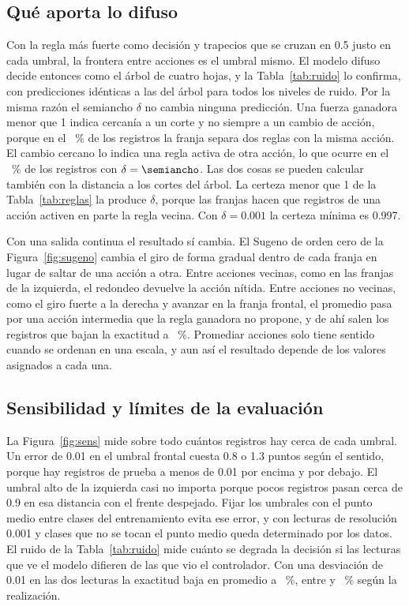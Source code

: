 \documentclass[11pt,letterpaper]{article}
\begin{document}
\subsection{Qué aporta lo difuso}

Con la regla más fuerte como decisión y trapecios que se cruzan en 0.5 justo en cada umbral, la frontera entre acciones es el umbral mismo. El modelo difuso decide entonces como el árbol de cuatro hojas, y la Tabla~\ref{tab:ruido} lo confirma, con predicciones idénticas a las del árbol para todos los niveles de ruido. Por la misma razón el semiancho $\delta$ no cambia ninguna predicción. Una fuerza ganadora menor que 1 indica cercanía a un corte y no siempre a un cambio de acción, porque en el \misma~\% de los registros la franja separa dos reglas con la misma acción. El cambio cercano lo indica una regla activa de otra acción, lo que ocurre en el \compite~\% de los registros con $\delta=\semiancho$. Las dos cosas se pueden calcular también con la distancia a los cortes del árbol. La certeza menor que 1 de la Tabla~\ref{tab:reglas} la produce $\delta$, porque las franjas hacen que registros de una acción activen en parte la regla vecina. Con $\delta=0.001$ la certeza mínima es 0.997.

Con una salida continua el resultado sí cambia. El Sugeno de orden cero de la Figura~\ref{fig:sugeno} cambia el giro de forma gradual dentro de cada franja en lugar de saltar de una acción a otra. Entre acciones vecinas, como en las franjas de la izquierda, el redondeo devuelve la acción nítida. Entre acciones no vecinas, como el giro fuerte a la derecha y avanzar en la franja frontal, el promedio pasa por una acción intermedia que la regla ganadora no propone, y de ahí salen los \erroresSugeno{} registros que bajan la exactitud a \accSugeno~\%. Promediar acciones solo tiene sentido cuando se ordenan en una escala, y aun así el resultado depende de los valores asignados a cada una.

\subsection{Sensibilidad y límites de la evaluación}

La Figura~\ref{fig:sens} mide sobre todo cuántos registros hay cerca de cada umbral. Un error de 0.01 en el umbral frontal cuesta 0.8 o 1.3 puntos según el sentido, porque hay \cercaArriba{} registros de prueba a menos de 0.01 por encima y \cercaAbajo{} por debajo. El umbral alto de la izquierda casi no importa porque pocos registros pasan cerca de 0.9 en esa distancia con el frente despejado. Fijar los umbrales con el punto medio entre clases del entrenamiento evita ese error, y con lecturas de resolución 0.001 y clases que no se tocan el punto medio queda determinado por los datos. El ruido de la Tabla~\ref{tab:ruido} mide cuánto se degrada la decisión si las lecturas que ve el modelo difieren de las que vio el controlador. Con una desviación de 0.01 en las dos lecturas la exactitud baja en promedio a \ruidoUno~\%, entre \ruidoUnoMin{} y \ruidoUnoMax~\% según la realización.
\end{document}
